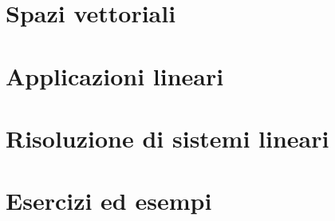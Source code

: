 \chapter{Spazi vettoriali}



\chapter{Applicazioni lineari}



\chapter{Risoluzione di sistemi lineari}



\chapter{Esercizi ed esempi}



\listoftables

\listoffigures


